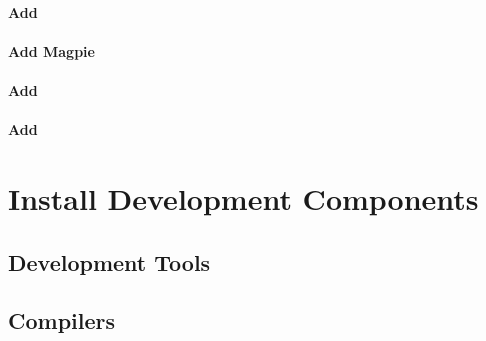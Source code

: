 \documentclass[letterpaper]{article}
\begin{document}
\paragraph{Add \genders{}}


\paragraph{Add Magpie}


\paragraph{Add \conman{}} \label{sec:add_conman}


\paragraph{Add \nhc{}} \label{sec:add_nhc}



%
%


\section{Install \OHPC{} Development Components}


\subsection{Development Tools} \label{sec:install_dev_tools}


\vspace*{-0.15cm}
\subsection{Compilers} \label{sec:install_compilers}

\end{document}
